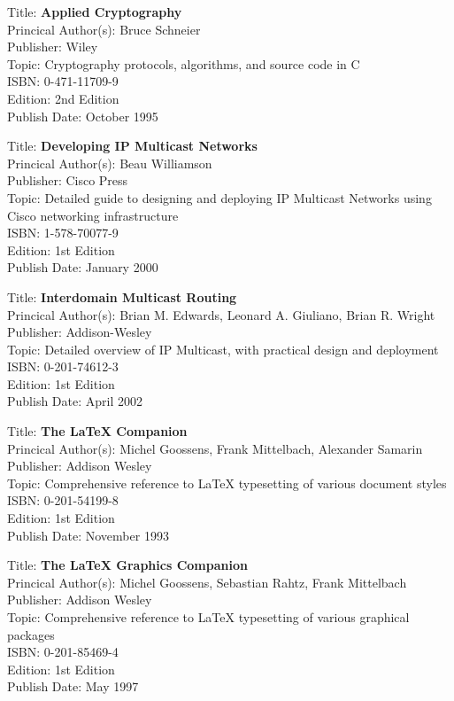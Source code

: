Title: 	\textbf{Applied Cryptography}	\\
Princical Author(s): 	Bruce Schneier  \\
Publisher:	Wiley	\\	
Topic:		Cryptography protocols, algorithms, and source code in C \\
ISBN:			0-471-11709-9 \\
Edition:		2nd Edition \\
Publish Date:		October 1995


Title: 	\textbf{Developing IP Multicast Networks}	\\
Princical Author(s): 	Beau Williamson  \\
Publisher:	Cisco Press	\\	
Topic:		Detailed guide to designing and deploying IP Multicast Networks using Cisco networking infrastructure \\
ISBN:			1-578-70077-9 \\
Edition:		1st Edition \\
Publish Date:		January 2000


Title: 	\textbf{Interdomain Multicast Routing}	\\
Princical Author(s): 	Brian M. Edwards, Leonard A. Giuliano, Brian R. Wright\\
Publisher:	Addison-Wesley	\\	
Topic:		Detailed overview of IP Multicast, with practical design and deployment \\
ISBN:			0-201-74612-3 \\
Edition:		1st Edition \\
Publish Date:		April 2002


Title: 	\textbf{The \textrm{\LaTeX{}}  Companion}	\\
Princical Author(s): 	Michel Goossens, Frank Mittelbach, Alexander Samarin  \\
Publisher:	Addison Wesley	\\	
Topic:		Comprehensive reference to \textrm{\LaTeX{}} typesetting of various document styles \\
ISBN:			0-201-54199-8 \\
Edition:		1st Edition \\
Publish Date:		November 1993


Title: 	\textbf{The \textrm{\LaTeX{}} Graphics Companion}	\\
Princical Author(s): 	Michel Goossens, Sebastian Rahtz, Frank Mittelbach  \\
Publisher:	Addison Wesley	\\	
Topic:		Comprehensive reference to \textrm{\LaTeX{}} typesetting of various graphical packages \\
ISBN:			0-201-85469-4 \\
Edition:		1st Edition \\
Publish Date:		May 1997

